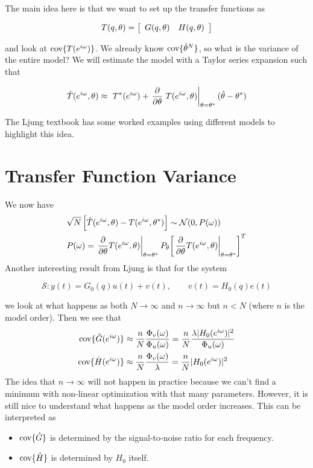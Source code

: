 The main idea here is that we want to set up the transfer functions as

\begin{equation*}
T(q,\theta) = \left[\begin{array}{c c} G(q,\theta) & H(q,\theta) \end{array}\right]
\end{equation*}

and look at $\text{cov}\{T (e^{i\omega})\}$.
We already know $\text{cov}\{\hat{\theta}^N\}$, so what is the variance of the entire model?
We will estimate the model with a Taylor series expansion such that

\begin{equation*}
\hat{T} (e^{i\omega},\theta) \approx~T^\ast(e^{i\omega}) + \left.\frac{\partial}{\partial\theta}~T (e^{i\omega},\theta)\right|_{\theta=\theta^\ast} (\hat{\theta}-\theta^\ast)
\end{equation*}

The Ljung textbook has some worked examples using different models to highlight this idea.

\section{Transfer Function Variance}
We now have
\begin{align*}
&\sqrt{N}\left[\hat{T}(e^{i\omega},\theta) - T(e^{i\omega},\theta^\ast)\right] \sim \mathcal{N}(0,P(\omega)) \\
&P(\omega) = \left.\frac{\partial}{\partial\theta} T(e^{i\omega},\theta)\right|_{\theta=\theta^\ast} P_\theta {\left[\left.\frac{\partial}{\partial\theta}T(e^{i\omega},\theta)\right|_{\theta=\theta^\ast}\right]}^T
\end{align*}
Another interesting result from Ljung is that for the system

\begin{equation*}
\mathcal{S}: y(t) = G_0(q)u(t)+v(t), \qquad v(t) = H_0(q)e(t)
\end{equation*}

we look at what happens as both $N\to\infty$ and $n\to\infty$ but $n<N$ (where $n$ is the model order).
Then we see that
\begin{align*}
\text{cov}\{\hat{G}(e^{i\omega})\} &\approx \frac{n}{N}\frac{\Phi_v(\omega)}{\Phi_u(\omega)} = \frac{n}{N}\frac{\lambda|H_0(e^{i\omega})|^2}{\Phi_u(\omega)} \\
\text{cov}\{\hat{H}(e^{i\omega})\} &\approx \frac{n}{N}\frac{\Phi_v(\omega)}{\lambda} = \frac{n}{N}|H_0(e^{i\omega})|^2
\end{align*}
The idea that $n\to\infty$ will not happen in practice because we can't find a minimum with non-linear optimization with that many parameters.
However, it is still nice to understand what happens as the model order increases.
This can be interpreted as
\begin{itemize}
\item $\text{cov}\{\hat{G}\}$ is determined by the signal-to-noise ratio for each frequency.
\item $\text{cov}\{\hat{H}\}$ is determined by $H_0$ itself.
\end{itemize}

